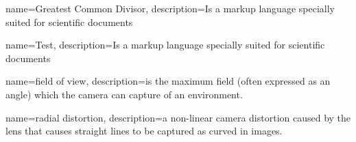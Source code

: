 




{
    name=Greatest Common Divisor,
    description={Is a markup language specially suited for 
scientific documents}
}

{
    name=Test,
    description={Is a markup language specially suited for 
scientific documents}
}

{
    name=field of view,
    description={is the maximum field (often expressed as an angle) which the camera can capture of an environment.}
}

{
    name=radial distortion,
    description={a non-linear camera distortion caused by the lens that causes straight lines to be captured as curved in images.}
}